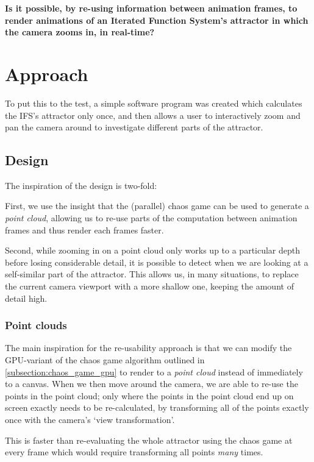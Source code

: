 \documentclass[11pt]{article}
\begin{document}
\textbf{\textbf{Is it possible, by re-using information between animation frames, 
to render animations of an Iterated Function System's attractor in which the camera zooms in, in real-time?}}

\section{Approach}
\label{sec:org0df2582}
\label{section:approach}

To put this to the test, a simple software program was created which calculates the IFS's attractor only once,
and then allows a user to interactively zoom and pan the camera around to investigate different parts of the attractor.

\subsection{Design}
\label{sec:org3ec50a9}

The inspiration of the design is two-fold:

First, we use the insight that the (parallel) chaos game can be used to generate a \emph{point cloud}, allowing us to re-use parts of the computation between animation frames
and thus render each frames faster.

Second, while zooming in on a point cloud only works up to a particular depth before losing considerable detail, 
it is possible to detect when we are looking at a self-similar part of the attractor.
This allows us, in many situations, to replace the current camera viewport with a more shallow one, 
keeping the amount of detail high.

\subsubsection{Point clouds}
\label{sec:org8609329}

The main inspiration for the re-usability approach is that we can modify the GPU-variant of the chaos game algorithm outlined in \autoref{subsection:chaos_game_gpu}
to render to a \emph{point cloud} instead of immediately to a canvas.
When we then move around the camera, we are able to re-use the points in the point cloud;
only where the points in the point cloud end up on screen exactly needs to be re-calculated, 
by transforming all of the points exactly once with the camera's `view transformation'.

This is faster than re-evaluating the whole attractor using the chaos game at every frame which would require transforming all points \emph{many} times.
\end{document}
